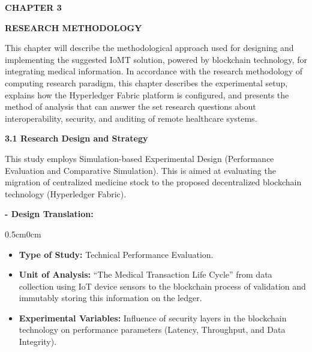 \documentclass[12pt, a4paper]{report}
\begin{document}
\newpage

\begin{titlepage}

    \centering
    \vspace*{10cm}
    
    {\color{myblue} \fontsize{30}{36}\selectfont \bfseries CHAPTER 3}
    
    \vspace{1cm}
    
    {\color{myblue} \Huge \bfseries RESEARCH METHODOLOGY}
\end{titlepage}



\newpage
\setlength{\parskip}{1em} 
\noindent This chapter will describe the methodological approach used for designing and implementing the suggested IoMT solution, powered by blockchain technology, for integrating medical information. In accordance with the research methodology of computing research paradigm, this chapter describes the experimental setup, explains how the Hyperledger Fabric platform is configured, and presents the method of analysis that can answer the set research questions about interoperability, security, and auditing of remote healthcare systems.

\vspace{0.5cm}
{\color{myblue} \Large \bfseries 3.1 Research Design and Strategy}

\noindent This study employs Simulation-based Experimental Design (Performance Evaluation and Comparative Simulation). This is aimed at evaluating the migration of centralized medicine stock to the proposed decentralized blockchain technology (Hyperledger Fabric).

\textbf{-	Design Translation:}
\begin{adjustwidth} {0.5cm}{0cm}
\vspace{-0.5em}
\begin{itemize}[nosep, topsep=0pt, partopsep=0pt]
    \item \textbf{Type of Study:} Technical Performance Evaluation.
    \item \textbf{Unit of Analysis:} “The Medical Transaction Life Cycle” from data collection using IoT device sensors to the blockchain process of validation and immutably storing this information on the ledger.
    \item \textbf{Experimental Variables:} Influence of security layers in the blockchain technology on performance parameters (Latency, Throughput, and Data Integrity).
\end{itemize}
\end{adjustwidth}
\end{document}
